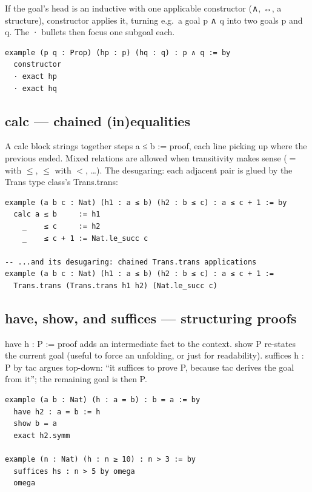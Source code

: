 \documentclass[12pt, openany]{book}
\theoremstyle{plain}
\theoremstyle{definition}
\theoremstyle{remark}
\newcommand{\li}[1]{{\ttfamily\small\color{tealaccent}#1}}
\begin{document}
If the goal's head is an inductive with one applicable constructor (\li{∧}, \li{↔}, a structure), \li{constructor} applies it, turning e.g.\ a goal \li{p ∧ q} into two goals \li{p} and \li{q}.  The \li{·} bullets then focus one subgoal each.

\begin{leanbox}
\begin{lstlisting}
example (p q : Prop) (hp : p) (hq : q) : p ∧ q := by
  constructor
  · exact hp
  · exact hq
\end{lstlisting}
\end{leanbox}
\color{black}

\subsection*{\li{calc} --- chained (in)equalities}

A \li{calc} block strings together steps \li{a ≤ b := proof}, each line picking up where the previous ended.  Mixed relations are allowed when transitivity makes sense ($=$ with $\leq$, $\leq$ with $<$, \ldots).  The desugaring: each adjacent pair is glued by the \li{Trans} type class's \li{Trans.trans}:

\begin{leanbox}
\begin{lstlisting}
example (a b c : Nat) (h1 : a ≤ b) (h2 : b ≤ c) : a ≤ c + 1 := by
  calc a ≤ b     := h1
    _    ≤ c     := h2
    _    ≤ c + 1 := Nat.le_succ c

-- ...and its desugaring: chained Trans.trans applications
example (a b c : Nat) (h1 : a ≤ b) (h2 : b ≤ c) : a ≤ c + 1 :=
  Trans.trans (Trans.trans h1 h2) (Nat.le_succ c)
\end{lstlisting}
\end{leanbox}
\color{black}

\subsection*{\li{have}, \li{show}, and \li{suffices} --- structuring proofs}

\li{have h : P := proof} adds an intermediate fact to the context.  \li{show P} re-states the current goal (useful to force an unfolding, or just for readability).  \li{suffices h : P by tac} argues top-down: ``it suffices to prove \li{P}, because \li{tac} derives the goal from it''; the remaining goal is then \li{P}.

\begin{leanbox}
\begin{lstlisting}
example (a b : Nat) (h : a = b) : b = a := by
  have h2 : a = b := h
  show b = a
  exact h2.symm

example (n : Nat) (h : n ≥ 10) : n > 3 := by
  suffices hs : n > 5 by omega
  omega
\end{lstlisting}
\end{leanbox}
\color{black}
\end{document}
